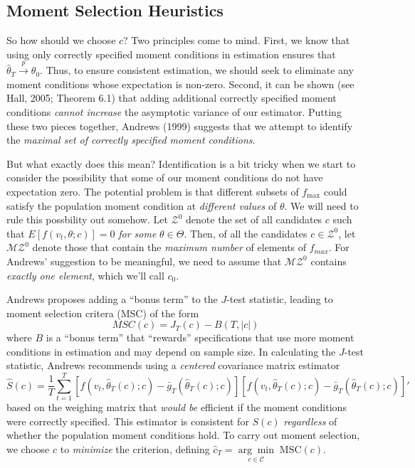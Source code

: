 \documentclass[12pt]{article}
\theoremstyle{definition}
\begin{document}
\subsection{Moment Selection Heuristics}
So how should we choose $c$? Two principles come to mind. First, we know that using only correctly specified moment conditions in estimation ensures that $\widehat{\theta}_T \overset{p}{\rightarrow} \theta_0$. Thus, to ensure consistent estimation, we should seek to eliminate any moment conditions whose expectation is non-zero. Second, it can be shown (see Hall, 2005; Theorem 6.1) that adding additional correctly specified moment conditions \emph{cannot increase} the asymptotic variance of our estimator. Putting these two pieces together, Andrews (1999) suggests that we attempt to identify the \emph{maximal set of correctly specified moment conditions}.

But what exactly does this mean? Identification is a bit tricky when we start to consider the possibility that some of our moment conditions do not have expectation zero. The potential problem is that different subsets of $f_{\max}$ could satisfy the population moment condition at \emph{different values} of $\theta$. We will need to rule this possbility out somehow. Let $\mathcal{Z}^0$ denote the set of all candidates $c$ such that $E[f(v_t, \theta; c)] = 0$ \emph{for some} $\theta\in \Theta$. Then, of all the candidates $c\in \mathcal{Z}^0$, let $\mathcal{MZ}^0$ denote those that contain the \emph{maximum number} of elements of $f_{max}$. For Andrews' suggestion to be meaningful, we need to assume that $\mathcal{MZ}^0$ contains \emph{exactly one element}, which we'll call $c_0$.

Andrews proposes adding a ``bonus term'' to the $J$-test statistic, leading to moment selection critera (MSC) of the form
	$$MSC(c) = J_T(c) - B(T, |c|)$$
where $B$ is a ``bonus term'' that ``rewards'' specifications that use more moment conditions in estimation and may depend on sample size. In calculating the $J$-test statistic, Andrews recommends using a \emph{centered} covariance matrix estimator
	$$\widehat{S}(c) = \frac{1}{T} \sum_{t=1}^T \left[f(v_t, \widehat{\theta}_T(c);c) - \bar{g}_T(\widehat{\theta}_T(c); c) \right]\left[f(v_t, \widehat{\theta}_T(c);c) - \bar{g}_T(\widehat{\theta}_T(c); c) \right]'$$
based on the weighing matrix that \emph{would be} efficient if the moment conditions were correctly specified. This estimator is consistent for $S(c)$ \emph{regardless} of whether the population moment conditions hold. To carry out moment selection, we choose $c$ to \emph{minimize} the criterion, defining $\widehat{c}_T = \underset{c\in\mathcal{C}}{\arg\min} \;\mbox{MSC}(c)$.
\end{document}
